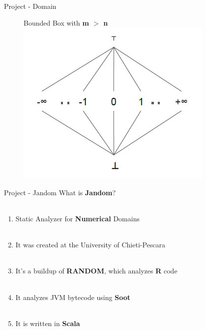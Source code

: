 \documentclass{beamer}
\begin{document}
	\begin{frame}{Project - Domain}
		\begin{figure}
			Bounded Box with \textbf{m $>$ n}
	\includegraphics[scale=0.8]{images/constant.jpg}
\end{figure}

\end{frame}

	\begin{frame}{Project - Jandom}
	What is \textbf{Jandom}?\\~\\
		\begin{enumerate}
			\item Static Analyzer for \textbf{Numerical} Domains\\~\\
			\item It was created at the University of Chieti-Pescara\\~\\
			\item It's a buildup of \textbf{RANDOM}, which analyzes \textbf{R} code\\~\\
			\item It analyzes JVM bytecode using \textbf{Soot}\\~\\
			\item It is written in \textbf{Scala}\\~\\
		\end{enumerate}
	\end{frame}
\end{document}

